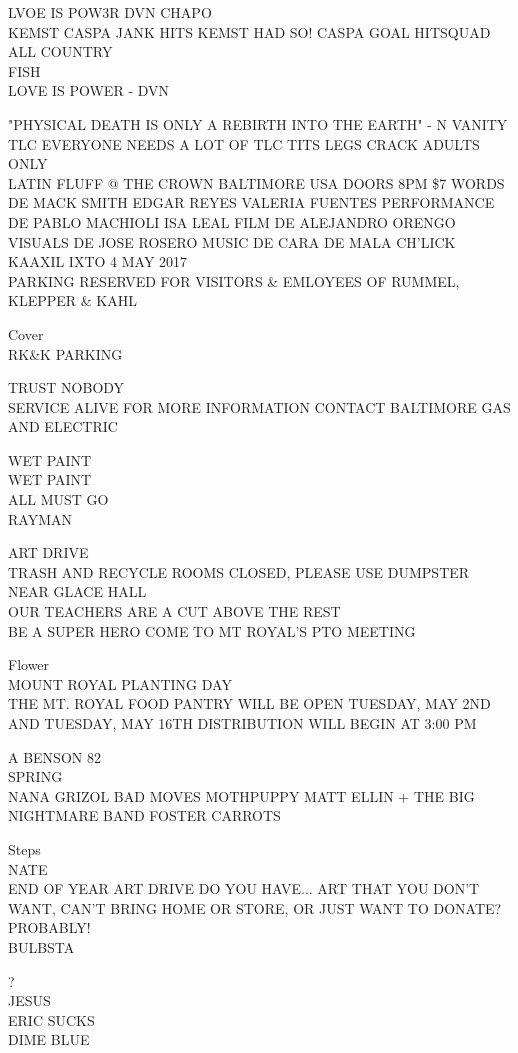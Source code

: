 \documentclass[10pt,letterpaper]{article}
\begin{document}
LVOE IS POW3R DVN CHAPO\\
KEMST CASPA JANK HITS KEMST HAD SO! CASPA GOAL HITSQUAD ALL COUNTRY\\
FISH\\
LOVE IS POWER {-} DVN

"PHYSICAL DEATH IS ONLY A REBIRTH INTO THE EARTH" {-} N VANITY\\
TLC EVERYONE NEEDS A LOT OF TLC TITS LEGS CRACK ADULTS ONLY\\
LATIN FLUFF @ THE CROWN BALTIMORE USA DOORS 8PM \$7 WORDS DE MACK SMITH EDGAR REYES VALERIA FUENTES PERFORMANCE DE PABLO MACHIOLI ISA LEAL FILM DE ALEJANDRO ORENGO VISUALS DE JOSE ROSERO MUSIC DE CARA DE MALA CH'LICK KAAXIL IXTO 4 MAY 2017\\
PARKING RESERVED FOR VISITORS \& EMLOYEES OF RUMMEL, KLEPPER \& KAHL

Cover\\
RK\&K PARKING

TRUST NOBODY\\
SERVICE ALIVE FOR MORE INFORMATION CONTACT BALTIMORE GAS AND ELECTRIC

WET PAINT\\
WET PAINT\\
ALL MUST GO\\
RAYMAN

ART DRIVE\\
TRASH AND RECYCLE ROOMS CLOSED, PLEASE USE DUMPSTER NEAR GLACE HALL\\
OUR TEACHERS ARE A CUT ABOVE THE REST\\
BE A SUPER HERO COME TO MT ROYAL'S PTO MEETING

Flower\\
MOUNT ROYAL PLANTING DAY\\
THE MT. ROYAL FOOD PANTRY WILL BE OPEN TUESDAY, MAY 2ND AND TUESDAY, MAY 16TH DISTRIBUTION WILL BEGIN AT 3:00 PM

A BENSON 82\\
SPRING\\
NANA GRIZOL BAD MOVES MOTHPUPPY MATT ELLIN + THE BIG NIGHTMARE BAND FOSTER CARROTS

Steps\\
NATE\\
END OF YEAR ART DRIVE DO YOU HAVE... ART THAT YOU DON'T WANT, CAN'T BRING HOME OR STORE, OR JUST WANT TO DONATE?  PROBABLY!\\
BULBSTA

?\\
JESUS\\
ERIC SUCKS\\
DIME BLUE
\end{document}
